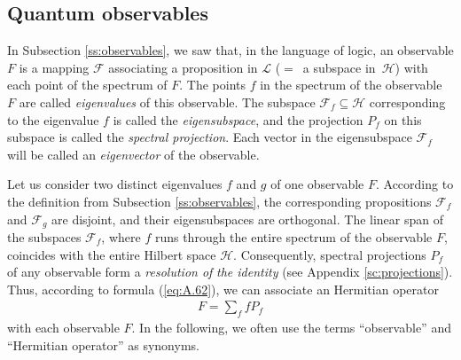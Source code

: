 \documentclass[nochecklpage]{stefan1}
\theoremstyle{definition}
\begin{document}
\subsection{Quantum observables}\label{ss:quant-obs2}
In Subsection \ref{ss:observables}, we saw that, in the language of logic,
an observable $F$ is a mapping $\mathcal{F}$ associating a proposition in $ \mathcal{L} $ ($=$~a subspace
in~$ \mathscr{H} $) with each point
of the spectrum of $F$. The points $ f $ in the spectrum of the observable
$ F $ are called \emph{eigenvalues} of this observable.
The subspace $ \mathscr{F}_{f} \subseteq \mathscr{H} $ corresponding to
the eigenvalue $ f $ is called the \emph{eigensubspace},
 and the projection $ P_{f} $ on this subspace is
called the \emph{spectral projection}. Each
vector in the eigensubspace $ \mathscr{F}_{f} $ will be called an
\emph{eigenvector} of the observable.

Let us consider two distinct eigenvalues $f$ and $g$ of one observable
$F$. According to the definition from Subsection \ref{ss:observables}, the
corresponding propositions $ \mathcal{F}_{f} $ and $ \mathcal{F}_{g} $
are disjoint, and their eigensubspaces are orthogonal. The linear span
of the subspaces $ \mathscr{F}_{f} $, where $ f $ runs through the
entire spectrum of the observable $ F $, coincides with the entire
Hilbert space $ \mathscr{H} $. Consequently, spectral projections $ P_f $ of any
observable form a \emph{resolution of} \emph{the identity} (see Appendix
\ref{sc:projections}). Thus, according to formula (\ref{eq:A.62}), we
can associate an Hermitian operator
%
\begin{align}
F = \sum_{f} f P_{f} \label{eq:op-obs}
\end{align}
%
with each observable $ F $. In the following, we often use the terms
``observable'' and ``Hermitian operator'' as synonyms.

\end{document}
